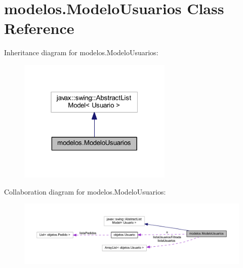 \hypertarget{classmodelos_1_1_modelo_usuarios}{}\section{modelos.\+Modelo\+Usuarios Class Reference}
\label{classmodelos_1_1_modelo_usuarios}


Inheritance diagram for modelos.\+Modelo\+Usuarios\+:
\nopagebreak
\begin{figure}[H]
\begin{center}
\leavevmode
\includegraphics[width=208pt]{classmodelos_1_1_modelo_usuarios__inherit__graph}
\end{center}
\end{figure}


Collaboration diagram for modelos.\+Modelo\+Usuarios\+:
\nopagebreak
\begin{figure}[H]
\begin{center}
\leavevmode
\includegraphics[width=350pt]{classmodelos_1_1_modelo_usuarios__coll__graph}
\end{center}
\end{figure}
